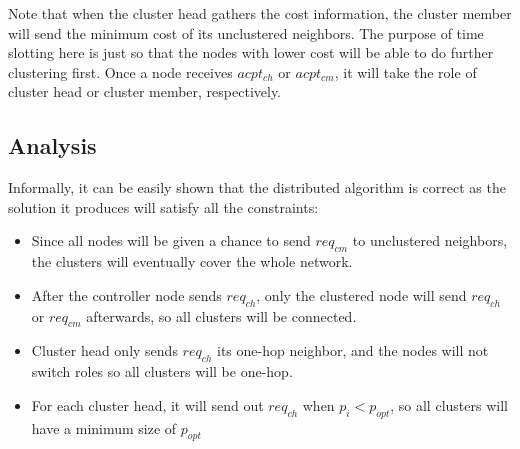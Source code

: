 Note that when the cluster head gathers the cost information, the cluster member will send the minimum cost of its unclustered neighbors. The purpose of time slotting here is just so that the nodes with lower cost will be able to do further clustering first. Once a node receives \(acpt_{ch}\) or \(acpt_{cm}\), it will take the role of cluster head or cluster member, respectively.

\subsection{Analysis}
Informally, it can be easily shown that the distributed algorithm is correct as the solution it produces will satisfy all the constraints:
\begin{itemize}
\item Since all nodes will be given a chance to send \(req_{cm}\) to unclustered neighbors, the clusters will eventually cover the whole network.
\item After the controller node sends \(req_{ch}\), only the clustered node will send \(req_{ch}\) or \(req_{cm}\) afterwards, so all clusters will be connected.
\item Cluster head only sends \(req_{ch}\) its one-hop neighbor, and the nodes will not switch roles so all clusters will be one-hop.
\item For each cluster head, it will send out \(req_{ch}\) when \(p_i<p_{opt}\), so all clusters will have a minimum size of \(p_{opt}\)
\end{itemize}
